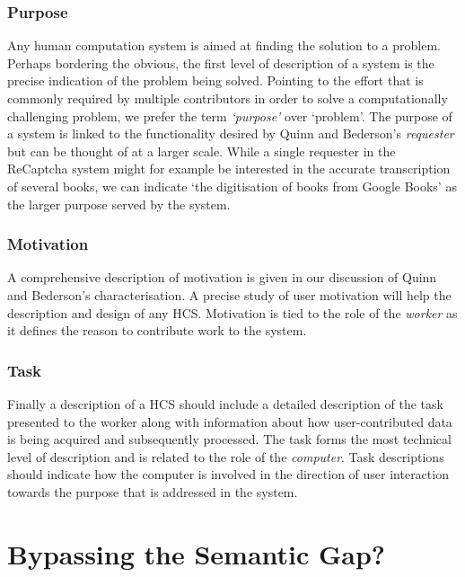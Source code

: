 \subsubsection{Purpose}

Any human computation system is aimed at finding the solution to a problem. Perhaps bordering the obvious, the first level of description of a system is the precise indication of the problem being solved. Pointing to the effort that is commonly required by multiple contributors in order to solve a computationally challenging problem, we prefer the term \emph{`purpose'} over `problem'. The purpose of a system is linked to the functionality desired by Quinn and Bederson's \emph{requester} but can be thought of at a larger scale. While a single requester in the ReCaptcha system might for example be interested in the accurate transcription of several books, we can indicate `the digitisation of books from Google Books' as the larger purpose served by the system.

\subsubsection{Motivation}

A comprehensive description of motivation is given in our discussion of Quinn and Bederson's characterisation. A precise study of user motivation will help the description and design of any HCS. Motivation is tied to the role of the \emph{worker} as it defines the reason to contribute work to the system.

\subsubsection{Task}

Finally a description of a HCS should include a detailed description of the task presented to the worker along with information about how user-contributed data is being acquired and subsequently processed. The task forms the most technical level of description and is related to the role of the \emph{computer}. Task descriptions should indicate how the computer is involved in the direction of user interaction towards the purpose that is addressed in the system.



\section{Bypassing the Semantic Gap?} %
\label{sec:bypassing_the_semantic_gap}

